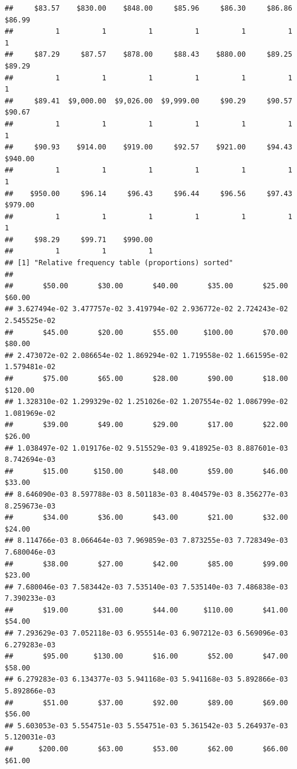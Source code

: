\begin{verbatim}
##     $83.57    $830.00    $848.00     $85.96     $86.30     $86.86     $86.99 
##          1          1          1          1          1          1          1 
##     $87.29     $87.57    $878.00     $88.43    $880.00     $89.25     $89.29 
##          1          1          1          1          1          1          1 
##     $89.41  $9,000.00  $9,026.00  $9,999.00     $90.29     $90.57     $90.67 
##          1          1          1          1          1          1          1 
##     $90.93    $914.00    $919.00     $92.57    $921.00     $94.43    $940.00 
##          1          1          1          1          1          1          1 
##    $950.00     $96.14     $96.43     $96.44     $96.56     $97.43    $979.00 
##          1          1          1          1          1          1          1 
##     $98.29     $99.71    $990.00 
##          1          1          1 
## [1] "Relative frequency table (proportions) sorted"
## 
##       $50.00       $30.00       $40.00       $35.00       $25.00       $60.00 
## 3.627494e-02 3.477757e-02 3.419794e-02 2.936772e-02 2.724243e-02 2.545525e-02 
##       $45.00       $20.00       $55.00      $100.00       $70.00       $80.00 
## 2.473072e-02 2.086654e-02 1.869294e-02 1.719558e-02 1.661595e-02 1.579481e-02 
##       $75.00       $65.00       $28.00       $90.00       $18.00      $120.00 
## 1.328310e-02 1.299329e-02 1.251026e-02 1.207554e-02 1.086799e-02 1.081969e-02 
##       $39.00       $49.00       $29.00       $17.00       $22.00       $26.00 
## 1.038497e-02 1.019176e-02 9.515529e-03 9.418925e-03 8.887601e-03 8.742694e-03 
##       $15.00      $150.00       $48.00       $59.00       $46.00       $33.00 
## 8.646090e-03 8.597788e-03 8.501183e-03 8.404579e-03 8.356277e-03 8.259673e-03 
##       $34.00       $36.00       $43.00       $21.00       $32.00       $24.00 
## 8.114766e-03 8.066464e-03 7.969859e-03 7.873255e-03 7.728349e-03 7.680046e-03 
##       $38.00       $27.00       $42.00       $85.00       $99.00       $23.00 
## 7.680046e-03 7.583442e-03 7.535140e-03 7.535140e-03 7.486838e-03 7.390233e-03 
##       $19.00       $31.00       $44.00      $110.00       $41.00       $54.00 
## 7.293629e-03 7.052118e-03 6.955514e-03 6.907212e-03 6.569096e-03 6.279283e-03 
##       $95.00      $130.00       $16.00       $52.00       $47.00       $58.00 
## 6.279283e-03 6.134377e-03 5.941168e-03 5.941168e-03 5.892866e-03 5.892866e-03 
##       $51.00       $37.00       $92.00       $89.00       $69.00       $56.00 
## 5.603053e-03 5.554751e-03 5.554751e-03 5.361542e-03 5.264937e-03 5.120031e-03 
##      $200.00       $63.00       $53.00       $62.00       $66.00       $61.00 

\end{verbatim}
